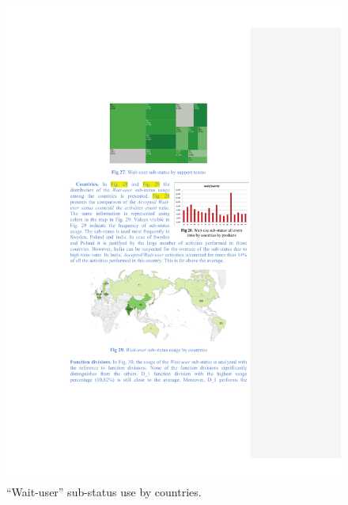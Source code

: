 \documentclass[lnbip]{svmultln}
\begin{document}
\begin{figure}
  \begin{center}
    \includegraphics[width=.9\textwidth]{"figs/pic 31"}
  \end{center}
  \caption{``Wait-user'' sub-status use by countries.}
  \label{fig:waitUseCountry}
\end{figure}
\end{document}
